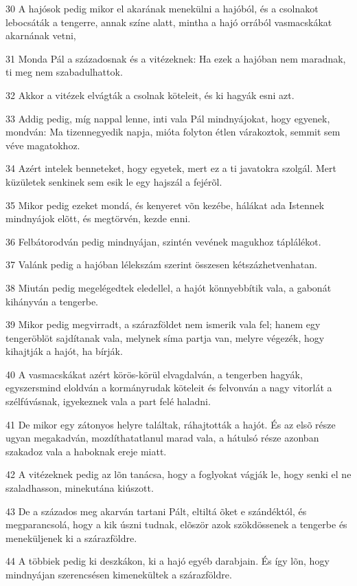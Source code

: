 \par 30 A hajósok pedig mikor el akarának menekülni a hajóból, és a csolnakot lebocsáták a tengerre, annak színe alatt, mintha a hajó orrából vasmacskákat akarnának vetni,
\par 31 Monda Pál a századosnak és a vitézeknek: Ha ezek a hajóban nem maradnak, ti meg nem szabadulhattok.
\par 32 Akkor a vitézek elvágták a csolnak köteleit, és ki hagyák esni azt.
\par 33 Addig pedig, míg nappal lenne, inti vala Pál mindnyájokat, hogy egyenek, mondván: Ma tizennegyedik napja, mióta folyton étlen várakoztok, semmit sem véve magatokhoz.
\par 34 Azért intelek benneteket, hogy egyetek, mert ez a ti javatokra szolgál. Mert küzületek senkinek sem esik le egy hajszál a fejérõl.
\par 35 Mikor pedig ezeket mondá, és kenyeret võn kezébe, hálákat ada Istennek mindnyájok elõtt, és megtörvén, kezde enni.
\par 36 Felbátorodván pedig mindnyájan, szintén vevének magukhoz táplálékot.
\par 37 Valánk pedig a hajóban lélekszám szerint összesen kétszázhetvenhatan.
\par 38 Miután pedig megelégedtek eledellel, a hajót könnyebbítik vala, a gabonát kihányván a tengerbe.
\par 39 Mikor pedig megvirradt, a szárazföldet nem ismerik vala fel; hanem egy tengeröblöt sajdítanak vala, melynek síma partja van, melyre végezék, hogy kihajtják a hajót, ha bírják.
\par 40 A vasmacskákat azért körös-körül elvagdalván, a tengerben hagyák, egyszersmind eloldván a kormányrudak köteleit és felvonván a nagy vitorlát a szélfúvásnak, igyekeznek vala a part felé haladni.
\par 41 De mikor egy zátonyos helyre találtak, ráhajtották a hajót. És az elsõ része ugyan megakadván, mozdíthatatlanul marad vala, a hátulsó része azonban szakadoz vala a haboknak ereje miatt.
\par 42 A vitézeknek pedig az lõn tanácsa, hogy a foglyokat vágják le, hogy senki el ne szaladhasson, minekutána kiúszott.
\par 43 De a százados meg akarván tartani Pált, eltiltá õket e szándéktól, és megparancsolá, hogy a kik úszni tudnak, elõször azok szökdössenek a tengerbe és meneküljenek ki a szárazföldre.
\par 44 A többiek pedig ki deszkákon, ki a hajó egyéb darabjain. És így lõn, hogy mindnyájan szerencsésen kimenekültek a szárazföldre.

